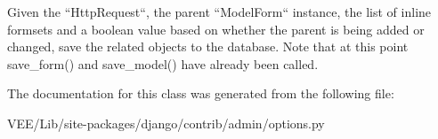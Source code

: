 \begin{DoxyVerb}Given the ``HttpRequest``, the parent ``ModelForm`` instance, the
list of inline formsets and a boolean value based on whether the
parent is being added or changed, save the related objects to the
database. Note that at this point save_form() and save_model() have
already been called.
\end{DoxyVerb}
 

The documentation for this class was generated from the following file\+:\begin{DoxyCompactItemize}
\item 
V\+E\+E/\+Lib/site-\/packages/django/contrib/admin/options.\+py\end{DoxyCompactItemize}
